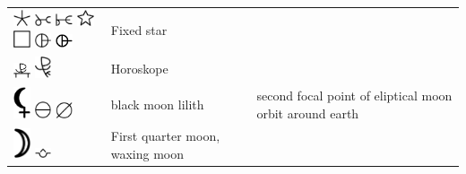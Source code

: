 \documentclass[british,final,landscape]{scrartcl}
\begin{document}
\begin{refsection}
\begin{supertabular}{p{0.3\textwidth}p{0.34\textwidth}p{0.34\textwidth}}
  \includegraphics[width=5mm]{Astrology/FixedStar} \includegraphics[width=5mm]{Astrology/FixedStar2} \includegraphics[width=5mm]{Astrology/FixedStar3} \includegraphics[width=5mm]{Astrology/FixedStar4} \includegraphics[width=5mm]{Astrology/FixedStar5} \includegraphics[width=5mm]{Astrology/FixedStar6} \includegraphics[width=5mm]{Astrology/FixedStar7} & Fixed star & \\
  \includegraphics[width=5mm]{Astrology/Horoscope} \includegraphics[width=5mm]{Astrology/Horoscope2} & Horoskope & \\
  \includegraphics[width=5mm]{Astrology/BlackMoonLilith} \includegraphics[width=5mm]{Astrology/BlackMoonLilith2} \includegraphics[width=5mm]{Astrology/BlackMoonLilith3}  & black moon lilith   & second focal point of eliptical moon orbit around earth \\
  \includegraphics[width=5mm]{Astrology/FirstQuarterMoon} \includegraphics[width=5mm]{Astrology/MoonWaxing} & First quarter moon, waxing moon  &  \\

\end{supertabular}
\end{refsection}
\end{document}
